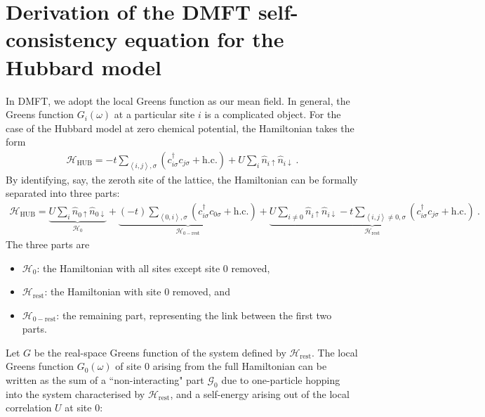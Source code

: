 \documentclass[12pt,onecolumn]{revtex4-2}
\begin{document}
\section{Derivation of the DMFT self-consistency equation for the Hubbard model}
In DMFT, we adopt the local Greens function as our mean field. In general, the Greens function \(G_i(\omega)\) at a particular site \(i\) is a complicated object. For the case of the Hubbard model at zero chemical potential, the Hamiltonian takes the form
\begin{equation}\begin{aligned}
	\mathcal{H}_\text{HUB} = -t\sum_{\left<i,j \right>,\sigma}\left( c^\dagger_{i\sigma}c_{j\sigma} + \text{h.c.} \right) + U \sum_i \hat n_{i \uparrow} \hat n_{i \downarrow}~.
\end{aligned}\end{equation}
By identifying, say, the zeroth site of the lattice, the Hamiltonian can be formally separated into three parts:
\begin{equation}\begin{aligned}
	\mathcal{H}_\text{HUB} = \underbrace{U \sum_i \hat n_{0 \uparrow} \hat n_{0 \downarrow}}_{\mathcal{H}_0} + \underbrace{(-t)\sum_{\left<0,i \right>,\sigma}\left( c^\dagger_{i\sigma}c_{0\sigma} + \text{h.c.} \right)}_{\mathcal{H}_{0-\text{rest}}} + \underbrace{U \sum_{i \neq 0} \hat n_{i \uparrow} \hat n_{i \downarrow} -t\sum_{\left<i,j \right>\neq 0,\sigma}\left( c^\dagger_{i\sigma}c_{j\sigma} + \text{h.c.} \right)}_{\mathcal{H}_\text{rest}}~.
\end{aligned}\end{equation}
The three parts are
\begin{itemize}
	\item \(\mathcal{H}_0\): the Hamiltonian with all sites except site 0 removed,
	\item \(\mathcal{H}_\text{rest}\): the Hamiltonian with site 0 removed, and
	\item \(\mathcal{H}_{0-\text{rest}}\): the remaining part, representing the link between the first two parts. 
\end{itemize}
Let \(G\) be the real-space Greens function of the system defined by \(\mathcal{H}_\text{rest}\). The local Greens function \(G_0(\omega)\) of site 0 arising from the full Hamiltonian can be written as the sum of a ``non-interacting" part \(\mathcal{G}_0\) due to one-particle hopping into the system characterised by \(\mathcal{H}_\text{rest}\), and a self-energy arising out of the local correlation \(U\) at site 0:
\end{document}
